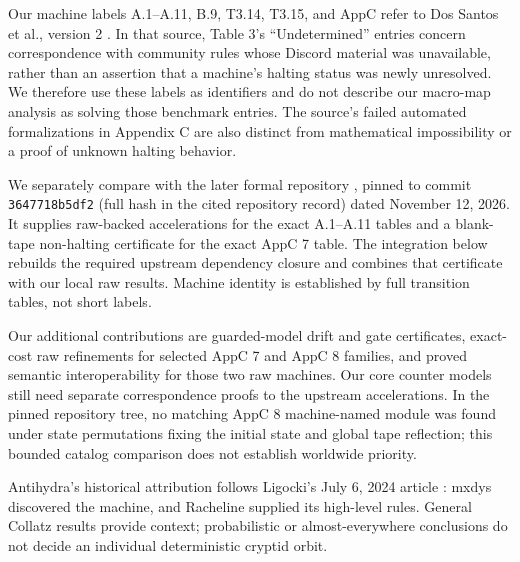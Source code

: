 \documentclass[11pt]{article}
\DeclareRobustCommand{\_}{\ifmmode\sb\else\textunderscore\allowbreak\fi}
\theoremstyle{definition}
\theoremstyle{remark}
\begin{document}
Our machine labels A.1--A.11, B.9, T3.14, T3.15, and AppC refer to Dos Santos et al., version 2 \cite{dossantos2026limits}. In that source, Table 3's ``Undetermined'' entries concern correspondence with community rules whose Discord material was unavailable, rather than an assertion that a machine's halting status was newly unresolved. We therefore use these labels as identifiers and do not describe our macro-map analysis as solving those benchmark entries. The source's failed automated formalizations in Appendix C are also distinct from mathematical impossibility or a proof of unknown halting behavior.

We separately compare with the later formal repository \cite{deepmind2026cryptidsSnapshot}, pinned to commit
\texttt{3647718b5df2} (full hash in the cited repository record)
dated November 12, 2026. It supplies raw-backed accelerations for the exact A.1--A.11 tables and a blank-tape non-halting certificate for the exact AppC 7 table. The integration below rebuilds the required upstream dependency closure and combines that certificate with our local raw results. Machine identity is established by full transition tables, not short labels.

Our additional contributions are guarded-model drift and gate certificates, exact-cost raw refinements for selected AppC 7 and AppC 8 families, and proved semantic interoperability for those two raw machines. Our core counter models still need separate correspondence proofs to the upstream accelerations. In the pinned repository tree, no matching AppC 8 machine-named module was found under state permutations fixing the initial state and global tape reflection; this bounded catalog comparison does not establish worldwide priority.

Antihydra's historical attribution follows Ligocki's July 6, 2024 article \cite{ligocki2024antihydra}: mxdys discovered the machine, and Racheline supplied its high-level rules. General Collatz results \cite{lagarias19853x,tao2022almost} provide context; probabilistic or almost-everywhere conclusions do not decide an individual deterministic cryptid orbit.
\end{document}

